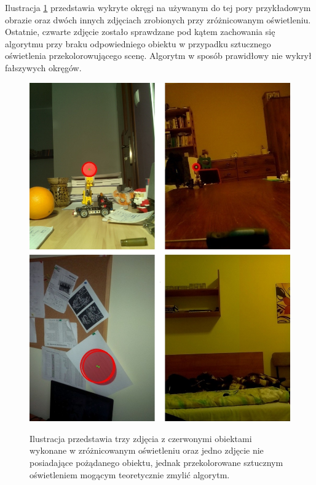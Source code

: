 Ilustracja \ref{przyklady} przedstawia wykryte okręgi na używanym do tej pory przykładowym obrazie oraz dwóch innych zdjęciach zrobionych przy zróżnicowanym oświetleniu. Ostatnie, czwarte zdjęcie zostało sprawdzane pod kątem zachowania się algorytmu przy braku odpowiedniego obiektu w przypadku sztucznego oświetlenia przekolorowującego scenę. Algorytm w sposób prawidłowy nie wykrył fałszywych okręgów.\newpage
\begin{figure}[H]
\begin{center}
\includegraphics[scale=0.6]{imgs/circles.jpg}
\caption[Przykładowe efekty końcowe algorytmu wykrywającego okręgi.]\small{Ilustracja przedstawia trzy zdjęcia z czerwonymi obiektami wykonane w zróżnicowanym oświetleniu oraz jedno zdjęcie nie posiadające pożądanego obiektu, jednak przekolorowane sztucznym oświetleniem mogącym teoretycznie zmylić algorytm.}
\label{przyklady}
\end{center}
\end{figure}
